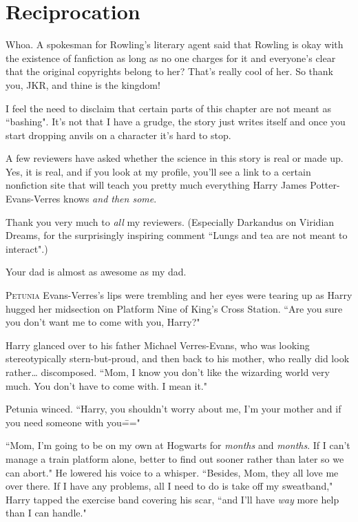 \chapter{Reciprocation}

\begin{chapterOpeningAuthorNote}
Whoa. A spokesman for Rowling's literary agent said that Rowling is okay with the existence of fanfiction as long as no one charges for it and everyone's clear that the original copyrights belong to her? That's really cool of her. So thank you, JKR, and thine is the kingdom!

I feel the need to disclaim that certain parts of this chapter are not meant as ``bashing". It's not that I have a grudge, the story just writes itself and once you start dropping anvils on a character it's hard to stop.

A few reviewers have asked whether the science in this story is real or made up. Yes, it is real, and if you look at my profile, you'll see a link to a certain nonfiction site that will teach you pretty much everything Harry James Potter-Evans-Verres knows \emph{and then some}.

Thank you very much to \emph{all} my reviewers. (Especially Darkandus on Viridian Dreams, for the surprisingly inspiring comment ``Lungs and tea are not meant to interact".)
\end{chapterOpeningAuthorNote}
\begin{chapterOpeningQuote}
Your dad is almost as awesome as my dad.
\end{chapterOpeningQuote}

\lettrine{P}{etunia} Evans-Verres's lips were trembling and her eyes were tearing up as Harry hugged her midsection on Platform Nine of King's Cross Station. ``Are you sure you don't want me to come with you, Harry?"

Harry glanced over to his father Michael Verres-Evans, who was looking stereotypically stern-but-proud, and then back to his mother, who really did look rather{\ldots} discomposed. ``Mom, I know you don't like the wizarding world very much. You don't have to come with. I mean it."

Petunia winced. ``Harry, you shouldn't worry about me, I'm your mother and if you need someone with you\==="

``Mom, I'm going to be on my own at Hogwarts for \emph{months} and \emph{months}. If I can't manage a train platform alone, better to find out sooner rather than later so we can abort." He lowered his voice to a whisper. ``Besides, Mom, they all love me over there. If I have any problems, all I need to do is take off my sweatband," Harry tapped the exercise band covering his scar, ``and I'll have \emph{way} more help than I can handle."

